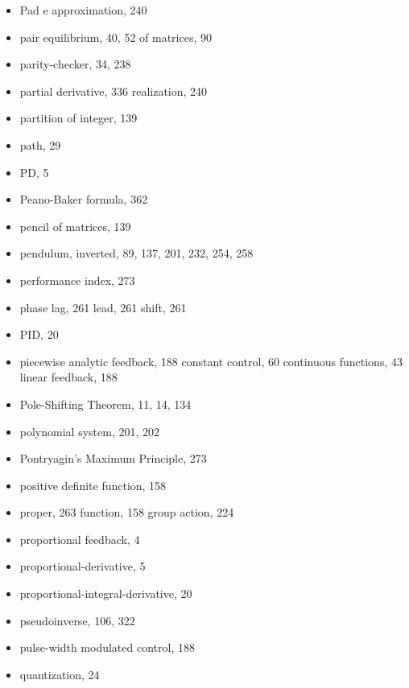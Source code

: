 \begin{itemize}
  \item Pad{ e} approximation, 240
  \item pair
    \subitem equilibrium, 40, 52
    \subitem of matrices, 90
  \item parity-checker, 34, 238
  \item partial
    \subitem derivative, 336
    \subitem realization, 240
  \item partition of integer, 139
  \item path, 29
  \item PD, 5
  \item Peano-Baker formula, 362
  \item pencil of matrices, 139
  \item pendulum, inverted, 89, 137, 201, 232, 254, 258
  \item performance index, 273
  \item phase
    \subitem lag, 261
    \subitem lead, 261
    \subitem shift, 261
  \item PID, 20
  \item piecewise
    \subitem analytic feedback, 188
    \subitem constant control, 60
    \subitem continuous functions, 43
    \subitem linear feedback, 188
  \item Pole-Shifting Theorem, 11, 14, 134
  \item polynomial system, 201, 202
  \item Pontryagin's Maximum Principle, 273
  \item positive definite function, 158
  \item proper, 263
    \subitem function, 158
    \subitem group action, 224
  \item proportional feedback, 4
  \item proportional-derivative, 5
  \item proportional-integral-derivative, 20
  \item pseudoinverse, 106, 322
  \item pulse-width modulated control, 188

  \indexspace

  \item quantization, 24

  \indexspace


\end{itemize}

